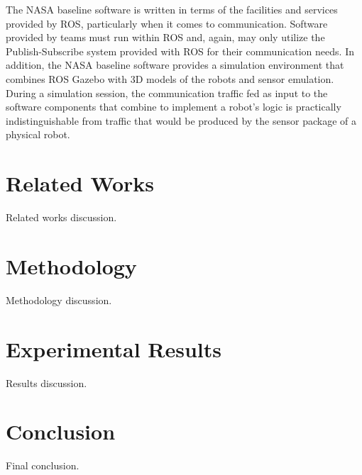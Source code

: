 \documentclass[sigconf,authordraft]{acmart}
\begin{document}
The NASA baseline software is written in terms of the facilities and services
provided by ROS, particularly when it comes to communication. Software provided
by teams must run within ROS and, again, may only utilize the Publish-Subscribe
system provided with ROS for their communication needs. In addition, the NASA
baseline software provides a simulation environment that combines ROS Gazebo
with 3D models of the robots and sensor emulation. During a simulation session,
the communication traffic fed as input to the software components that combine
to implement a robot's logic is practically indistinguishable from traffic that
would be produced by the sensor package of a physical robot.

\section{Related Works}\label{sec:related_works}
Related works discussion.

\section{Methodology}\label{sec:methodology}
Methodology discussion.

\section{Experimental Results}\label{sec:results}
Results discussion.

\section{Conclusion}\label{sec:conclusion}
Final conclusion.



\end{document}
